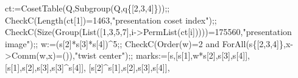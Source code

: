 \documentclass[
  10pt,
  letterpaper,
]{article}
\newenvironment{Shaded}{}{}
\newcommand{\BuiltInTok}[1]{\textcolor[rgb]{0.00,0.50,0.00}{#1}}
\newcommand{\ConstantTok}[1]{\textcolor[rgb]{0.53,0.00,0.00}{#1}}
\newcommand{\FloatTok}[1]{\textcolor[rgb]{0.25,0.63,0.44}{#1}}
\newcommand{\NormalTok}[1]{#1}
\newcommand{\OperatorTok}[1]{\textcolor[rgb]{0.40,0.40,0.40}{#1}}
\newcommand{\StringTok}[1]{\textcolor[rgb]{0.25,0.44,0.63}{#1}}
\newcommand{\VariableTok}[1]{\textcolor[rgb]{0.10,0.09,0.49}{#1}}
\begin{document}
\begin{Shaded}
\begin{Highlighting}[]
\VariableTok{ct}\OperatorTok{:=}\BuiltInTok{CosetTable}\NormalTok{(}\VariableTok{Q}\OperatorTok{,}\BuiltInTok{Subgroup}\NormalTok{(}\VariableTok{Q}\OperatorTok{,}\VariableTok{q}\NormalTok{\{[}\FloatTok{2}\OperatorTok{,}\FloatTok{3}\OperatorTok{,}\FloatTok{4}\NormalTok{]\}))}\OperatorTok{;;}
\VariableTok{CheckC}\NormalTok{(}\BuiltInTok{Length}\NormalTok{(}\VariableTok{ct}\NormalTok{[}\FloatTok{1}\NormalTok{])}\OperatorTok{=}\FloatTok{1463}\OperatorTok{,}\StringTok{"presentation coset index"}\NormalTok{)}\OperatorTok{;;}
\VariableTok{CheckC}\NormalTok{(}\BuiltInTok{Size}\NormalTok{(}\BuiltInTok{Group}\NormalTok{(}\BuiltInTok{List}\NormalTok{([}\FloatTok{1}\OperatorTok{,}\FloatTok{3}\OperatorTok{,}\FloatTok{5}\OperatorTok{,}\FloatTok{7}\NormalTok{]}\OperatorTok{,}\VariableTok{i}\OperatorTok{{-}\textgreater{}}\BuiltInTok{PermList}\NormalTok{(}\VariableTok{ct}\NormalTok{[}\VariableTok{i}\NormalTok{]))))}\OperatorTok{=}\FloatTok{175560}\OperatorTok{,}\StringTok{"presentation image"}\NormalTok{)}\OperatorTok{;;}
\VariableTok{w}\OperatorTok{:=}\NormalTok{(}\VariableTok{s}\NormalTok{[}\FloatTok{2}\NormalTok{]}\OperatorTok{*}\VariableTok{s}\NormalTok{[}\FloatTok{3}\NormalTok{]}\OperatorTok{*}\VariableTok{s}\NormalTok{[}\FloatTok{4}\NormalTok{])}\OperatorTok{\^{}}\FloatTok{5}\OperatorTok{;;}
\VariableTok{CheckC}\NormalTok{(}\BuiltInTok{Order}\NormalTok{(}\VariableTok{w}\NormalTok{)}\OperatorTok{=}\FloatTok{2} \ConstantTok{and} \BuiltInTok{ForAll}\NormalTok{(}\VariableTok{s}\NormalTok{\{[}\FloatTok{2}\OperatorTok{,}\FloatTok{3}\OperatorTok{,}\FloatTok{4}\NormalTok{]\}}\OperatorTok{,}\VariableTok{x}\OperatorTok{{-}\textgreater{}}\BuiltInTok{Comm}\NormalTok{(}\VariableTok{w}\OperatorTok{,}\VariableTok{x}\NormalTok{)}\OperatorTok{=}\NormalTok{())}\OperatorTok{,}\StringTok{"twist center"}\NormalTok{)}\OperatorTok{;;}
\VariableTok{marks}\OperatorTok{:=}\NormalTok{[}\VariableTok{s}\OperatorTok{,}\NormalTok{[}\VariableTok{s}\NormalTok{[}\FloatTok{1}\NormalTok{]}\OperatorTok{,}\VariableTok{w}\OperatorTok{*}\VariableTok{s}\NormalTok{[}\FloatTok{2}\NormalTok{]}\OperatorTok{,}\VariableTok{s}\NormalTok{[}\FloatTok{3}\NormalTok{]}\OperatorTok{,}\VariableTok{s}\NormalTok{[}\FloatTok{4}\NormalTok{]]}\OperatorTok{,}
\NormalTok{ [}\VariableTok{s}\NormalTok{[}\FloatTok{1}\NormalTok{]}\OperatorTok{,}\VariableTok{s}\NormalTok{[}\FloatTok{2}\NormalTok{]}\OperatorTok{,}\VariableTok{s}\NormalTok{[}\FloatTok{3}\NormalTok{]}\OperatorTok{,}\VariableTok{s}\NormalTok{[}\FloatTok{3}\NormalTok{]}\OperatorTok{\^{}}\VariableTok{s}\NormalTok{[}\FloatTok{4}\NormalTok{]]}\OperatorTok{,}
\NormalTok{ [}\VariableTok{s}\NormalTok{[}\FloatTok{2}\NormalTok{]}\OperatorTok{\^{}}\VariableTok{s}\NormalTok{[}\FloatTok{1}\NormalTok{]}\OperatorTok{,}\VariableTok{s}\NormalTok{[}\FloatTok{2}\NormalTok{]}\OperatorTok{,}\VariableTok{s}\NormalTok{[}\FloatTok{3}\NormalTok{]}\OperatorTok{,}\VariableTok{s}\NormalTok{[}\FloatTok{4}\NormalTok{]]}\OperatorTok{,}

\end{Highlighting}
\end{Shaded}
\end{document}
